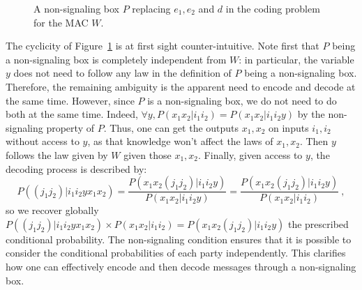 \begin{figure}[!h]
\caption{A non-signaling box $P$ replacing $e_1,e_2$ and $d$ in the coding problem for the MAC $W$.}
\label{fig:MACNScoding}
\end{figure}

The cyclicity of Figure~\ref{fig:MACNScoding} is at first sight counter-intuitive. Note first that $P$ being a non-signaling box is completely independent from $W$: in particular, the variable $y$ does not need to follow any law in the definition of $P$ being a non-signaling box. Therefore, the remaining ambiguity is the apparent need to encode and decode at the same time. However, since $P$ is a non-signaling box, we do not need to do both at the same time. Indeed, $\forall y, P(x_1x_2|i_1i_2) = P(x_1x_2|i_1i_2y)$ by the non-signaling property of $P$. Thus, one can get the outputs $x_1,x_2$ on inputs $i_1,i_2$ without access to $y$, as that knowledge won't affect the laws of $x_1,x_2$. Then $y$ follows the law given by $W$ given those $x_1,x_2$. Finally, given access to $y$, the decoding process is described by:
          \[ P((j_1 j_2)|i_1 i_2 y x_1 x_2) = \frac{P(x_1 x_2 (j_1 j_2)|i_1 i_2 y)}{P(x_1 x_2 |i_1 i_2 y)} = \frac{P(x_1 x_2 (j_1 j_2)|i_1 i_2 y)}{P(x_1 x_2 |i_1 i_2)} \ , \]
          so we recover globally $P((j_1 j_2)|i_1 i_2 y x_1 x_2) \times P(x_1 x_2 |i_1 i_2) = P(x_1 x_2 (j_1 j_2)|i_1 i_2 y)$ the prescribed conditional probability. 
          The non-signaling condition ensures that it is possible to consider the conditional probabilities of each party independently. This clarifies how one can effectively encode and then decode messages through a non-signaling box.

